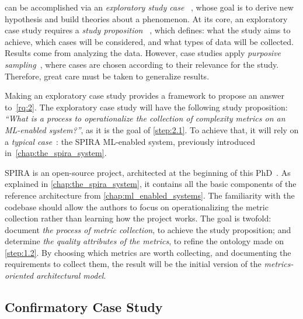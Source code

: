   can be accomplished via an \emph{exploratory study case}%
  ~\parencite{Easterbrook2008SelectingEngineering}, whose goal is to 
  derive new hypothesis and build theories about a phenomenon. At its core,
  an exploratory case study requires a \emph{study proposition}%
  ~\parencite{Easterbrook2008SelectingEngineering}, which defines:
    what the study aims to achieve,
    which cases will be considered, and
    what types of data will be collected.
  Results come from analyzing the data. However, case studies apply
  \emph{purposive sampling}~\parencite{Easterbrook2008SelectingEngineering},
  where cases are chosen according to their relevance for the study.
  Therefore, great care must be taken to generalize results.

  Making an exploratory case study provides a framework to propose an answer
  to~\cref{rq:2}. The exploratory case study will have the following
  study proposition: \emph{``What is a process to operationalize the
  collection of complexity metrics on an ML-enabled system?''}, as it is
  the goal of \cref{step:2.1}. To achieve that, it will rely on a
  \emph{typical case}~\parencite{Easterbrook2008SelectingEngineering}:
  the SPIRA ML-enabled system, previously introduced
  in~\cref{chap:the_spira_system}.

  SPIRA is an open-source project, architected at the beginning of
  this PhD~\parencite{Ferreira2022SPIRA:Detection}. As explained in
  \cref{chap:the_spira_system}, it contains all the basic components of
  the reference architecture from \cref{chap:ml_enabled_systems}.
  The familiarity with the codebase should allow the authors to focus
  on operationalizing the metric collection rather than learning how the
  project works. The goal is twofold:
    document \emph{the process of metric collection},
    to achieve the study proposition; and
    determine \emph{the quality attributes of the metrics},
    to refine the ontology made on \cref{step:1.2}.
  By choosing which metrics are worth collecting, and documenting
  the requirements to collect them, the result will be the initial version
  of the \emph{metrics-oriented architectural model}.

  \subsection{Confirmatory Case Study}
  \MethodologyStep

